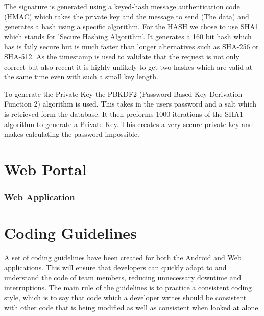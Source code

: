 \documentclass[11pt,a4paper]{article}
\begin{document}
The signature is generated using a keyed-hash message authentication code (HMAC) which takes the private key and the message to send (The data) and generates a hash using a specific algorithm. For the HASH we chose to use SHA1 which stands for 'Secure Hashing Algorithm'. It generates a 160 bit hash which has is faily secure but is much faster than longer alternatives such as SHA-256 or SHA-512. As the timestamp is used to validate that the request is not only correct but also recent it is highly unlikely to get two hashes which are valid at the same time even with such a small key length. 

To generate the Private Key the PBKDF2 (Password-Based Key Derivation Function 2) algorithm is used. This takes in the users password and a salt which is retrieved form the database. It then preforms 1000 iterations of the SHA1 algorithm to generate a Private Key. This creates a very secure private key and makes calculating the password impossible. 

\section{Web Portal}

\subsubsection{Web Application}

\section{Coding Guidelines}
A set of coding guidelines have been created for both the Android and Web applications. This will ensure that developers can quickly adapt to and understand the code of team members, reducing unnecessary downtime and interruptions. The main rule of the guidelines is to practice a consistent coding style, which is to say that code which a developer writes should be consistent with other code that is being modified as well as consistent when looked at alone.
\end{document}

